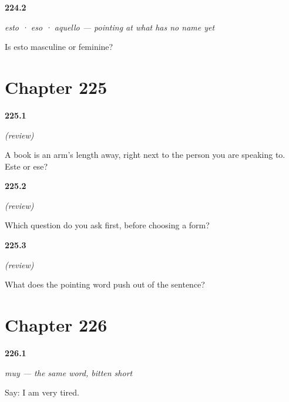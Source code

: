 \noindent\begin{minipage}[t]{\linewidth}
\raggedright
\hypertarget{review-ES-C59-esto-eso-aquello-gender}{\textbf{224.2}} \emph{esto · eso · aquello — pointing at what has no name yet}\par
\small Is esto masculine or feminine?
\end{minipage}\par\medskip

\section*{Chapter 225}

\noindent\begin{minipage}[t]{\linewidth}
\raggedright
\hypertarget{review-ES-C59-repaso-demostrativos-side}{\textbf{225.1}} \emph{(review)}\par
\small A book is an arm's length away, right next to the person you are speaking to. Este or ese?
\end{minipage}\par\medskip

\noindent\begin{minipage}[t]{\linewidth}
\raggedright
\hypertarget{review-ES-C59-repaso-demostrativos-noun}{\textbf{225.2}} \emph{(review)}\par
\small Which question do you ask first, before choosing a form?
\end{minipage}\par\medskip

\noindent\begin{minipage}[t]{\linewidth}
\raggedright
\hypertarget{review-ES-C59-repaso-demostrativos-article}{\textbf{225.3}} \emph{(review)}\par
\small What does the pointing word push out of the sentence?
\end{minipage}\par\medskip

\section*{Chapter 226}

\noindent\begin{minipage}[t]{\linewidth}
\raggedright
\hypertarget{review-ES-C60-muy-say}{\textbf{226.1}} \emph{muy — the same word, bitten short}\par
\small Say: I am very tired.
\end{minipage}\par\medskip

